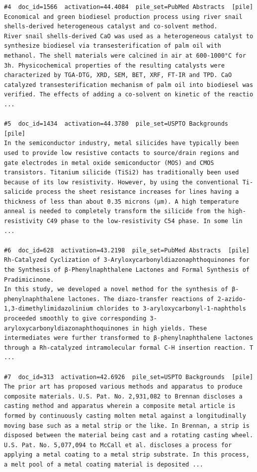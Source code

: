 \begin{verbatim}
#4  doc_id=1566  activation=44.4084  pile_set=PubMed Abstracts  [pile]
Economical and green biodiesel production process using river snail shells-derived heterogeneous catalyst and co-solvent method.
River snail shells-derived CaO was used as a heterogeneous catalyst to synthesize biodiesel via transesterification of palm oil with methanol. The shell materials were calcined in air at 600-1000°C for 3h. Physicochemical properties of the resulting catalysts were characterized by TGA-DTG, XRD, SEM, BET, XRF, FT-IR and TPD. CaO catalyzed transesterification mechanism of palm oil into biodiesel was verified. The effects of adding a co-solvent on kinetic of the reactio ...

#5  doc_id=1434  activation=44.3780  pile_set=USPTO Backgrounds  [pile]
In the semiconductor industry, metal silicides have typically been used to provide low resistive contacts to source/drain regions and gate electrodes in metal oxide semiconductor (MOS) and CMOS transistors. Titanium silicide (TiSi2) has traditionally been used because of its low resistivity. However, by using the conventional Ti-salicide process the sheet resistance increases for lines having a thickness of less than about 0.35 microns (μm). A high temperature anneal is needed to completely transform the silicide from the high-resistivity C49 phase to the low-resistivity C54 phase. In some lin ...

#6  doc_id=628  activation=43.2198  pile_set=PubMed Abstracts  [pile]
Rh-Catalyzed Cyclization of 3-Aryloxycarbonyldiazonaphthoquinones for the Synthesis of β-Phenylnaphthalene Lactones and Formal Synthesis of Pradimicinone.
In this study, we developed a novel method for the synthesis of β-phenylnaphthalene lactones. The diazo-transfer reactions of 2-azido-1,3-dimethylimidazolinium chlorides to 3-aryloxycarbonyl-1-naphthols proceeded smoothly to give corresponding 3-aryloxycarbonyldiazonaphthoquinones in high yields. These intermediates were further transformed to β-phenylnaphthalene lactones through a Rh-catalyzed intramolecular formal C-H insertion reaction. T ...

#7  doc_id=313  activation=42.6926  pile_set=USPTO Backgrounds  [pile]
The prior art has proposed various methods and apparatus to produce composite materials. U.S. Pat. No. 2,931,082 to Brennan discloses a casting method and apparatus wherein a composite metal article is formed by continuously casting molten metal against a longitudinally moving base such as a metal strip or the like. In Brennan, a strip is disposed between the material being cast and a rotating casting wheel.
U.S. Pat. No. 5,077,094 to McCall et al. discloses a process for applying a metal coating to a metal strip substrate. In this process, a melt pool of a metal coating material is deposited ...


\end{verbatim}
